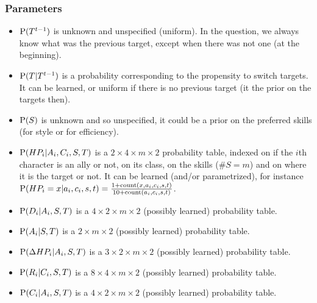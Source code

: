 

\subsubsection{Parameters}

\begin{itemize}
    \item $\mathrm{P}(T^{t-1})$ is unknown and unspecified (uniform). In the question, we always know what was the previous target, except when there was not one (at the beginning).
    \item $\mathrm{P}(T|T^{t-1})$ is a probability corresponding to the propensity to switch targets. It can be learned, or uniform if there is no previous target (it the prior on the targets then).
    \item $\mathrm{P}(S)$ is unknown and so unspecified, it could be a prior on the preferred skills (for style or for efficiency).
    \item $\mathrm{P}(HP_i | A_i, C_i, S, T)$ is a $2\times4\times m \times 2$ probability table, indexed on if the $i$th character is an ally or not, on its class, on the skills ($\#S=m$) and on where it is the target or not. It can be learned (and/or parametrized), for instance $\mathrm{P}(HP_i=x|a_i,c_i,s,t)=\frac{1+\mathrm{count}(x,a_i,c_i,s,t)}{10+\mathrm{count}(a_i,c_i,s,t)}$.
    \item $\mathrm{P}(D_i | A_i, S, T)$ is a $4\times2 \times m \times 2$ (possibly learned) probability table.
    \item $\mathrm{P}(A_i | S, T)$ is a $2 \times m \times 2$ (possibly learned) probability table.
    \item $\mathrm{P}(\Delta HP_i | A_i, S, T)$ is a $3 \times 2 \times m \times 2$ (possibly learned) probability table.
    \item $\mathrm{P}(R_i | C_i, S, T)$ is a $8 \times 4 \times m \times 2$ (possibly learned) probability table.
    \item $\mathrm{P}(C_i | A_i, S, T)$ is a $4 \times 2 \times m \times 2$ (possibly learned) probability table.
\end{itemize}

